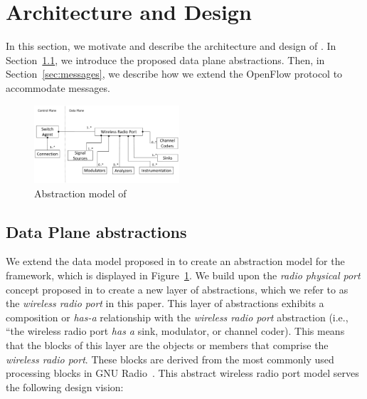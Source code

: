 \section{\crossflow Architecture and Design}
\label{sec:architecture}

In this section, we motivate and describe the architecture and design of \crossflow. In Section~\ref{sec:data_plane}, we introduce the proposed data plane abstractions. Then, in Section~\ref{sec:messages}, we describe how we extend the OpenFlow protocol to accommodate \crossflow messages.


\begin{figure}[t]
  \centering
  \includegraphics[width=0.48\textwidth]{figures/UML.pdf}
  \caption{Abstraction model of \crossflow}
  \label{fig:uml}
\end{figure}


\subsection{Data Plane abstractions}
\label{sec:data_plane}
We extend the data model proposed in \cite{Casey:14} to create an abstraction model for the \crossflow framework, which is displayed in Figure~\ref{fig:uml}. We build upon the \emph{radio physical port} concept proposed in \cite{aetherflow} to create a new layer of abstractions, which we refer to as the \emph{wireless radio port} in this paper. This layer of abstractions exhibits a composition or \emph{has-a} relationship with the \emph{wireless radio port} abstraction (i.e., ``the wireless radio port \emph{has a} sink, modulator, or channel coder). This means that the blocks of this layer are the objects or members that comprise the \emph{wireless radio port}. These blocks are derived from the most commonly used processing blocks in GNU Radio~\cite{gnuradio}. This abstract wireless radio port model serves the following design vision:

